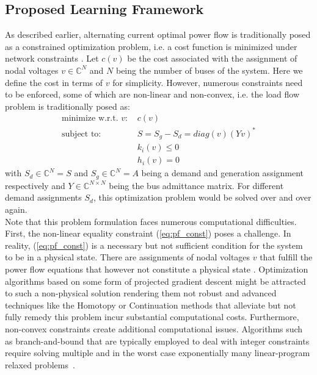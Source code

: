 \subsection{Proposed Learning Framework}
As described earlier, alternating current optimal power flow is traditionally posed as a constrained optimization problem, i.e. a cost function is minimized under network constraints \cite{carpentier1962contribution}. Let $c(v)$ be the cost associated with the assignment of nodal voltages $v \in \mathbb{C}^N$ and $N$ being the number of buses of the system. Here we define the cost in terms of $v$ for simplicity. However, numerous constraints need to be enforced, some of which are non-linear and non-convex, i.e. the load flow problem is traditionally posed as:
\begin{align}
\text{minimize w.r.t. $v$:\ }& c(v)\\
\text{subject to:\ }& S = S_{g} - S_{d} = diag(v)(Yv)^* \label{eq:pf_const}\\
 & k_i(v) \leq 0\\
 & h_i(v) = 0
\end{align}
with $S_d\in \mathbb{C}^N = S$ and $S_g\in \mathbb{C}^N = A$ being a demand and generation assignment respectively and $Y\in \mathbb{C}^{N \times N}$ being the bus admittance matrix.
For different demand assignments $S_d$, this optimization problem would be solved over and over again.\\
Note that this problem formulation faces numerous computational difficulties. First, the non-linear equality constraint (\ref{eq:pf_const}) poses a challenge. In reality, (\ref{eq:pf_const}) is a necessary but not sufficient condition for the system to be in a physical state. There are assignments of nodal voltages $v$ that fulfill the power flow equations that however not constitute a physical state \cite{tamura1983relationship,thorp1997load}. Optimization algorithms based on some form of projected gradient descent might be attracted to such a non-physical solution rendering them not robust and advanced techniques like the Homotopy \cite{okumura1991solution} or Continuation \cite{milano2009continuous} methods that alleviate but not fully remedy this problem incur substantial computational costs. Furthermore, non-convex constraints create additional computational issues. Algorithms such as branch-and-bound that are typically employed to deal with integer constraints require solving multiple and in the worst case exponentially many linear-program relaxed problems~\cite{lawler1966branch}.\\

